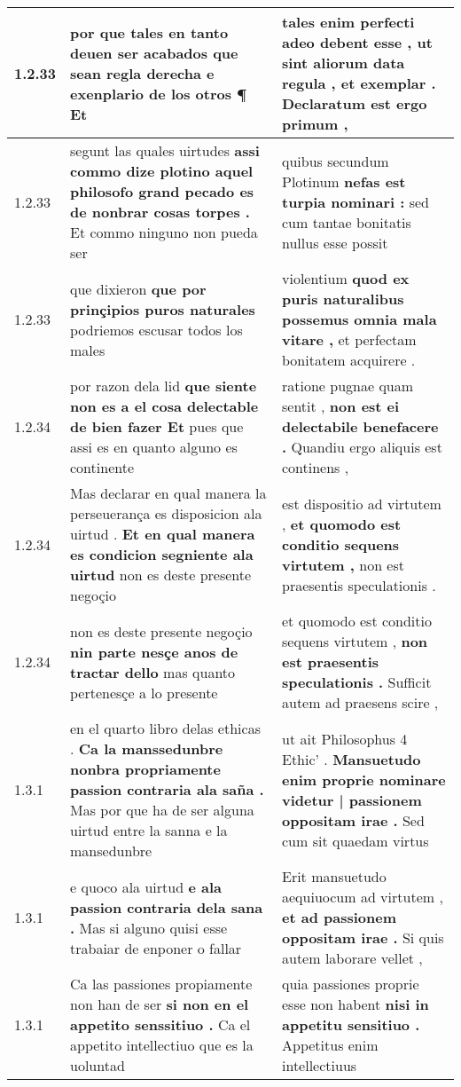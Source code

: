 \begin{tabular}{|p{1cm}|p{6.5cm}|p{6.5cm}|}
1.2.33 & por que tales en tanto deuen ser acabados \textbf{ que sean regla derecha e exenplario de los otros ¶ } Et & tales enim perfecti adeo debent esse , \textbf{ ut sint aliorum data regula , et exemplar . } Declaratum est ergo primum , \\\hline
1.2.33 & segunt las quales uirtudes \textbf{ assi commo dize plotino aquel philosofo grand pecado es de nonbrar cosas torpes . } Et commo ninguno non pueda ser & quibus secundum Plotinum \textbf{ nefas est turpia nominari : } sed cum tantae bonitatis nullus esse possit \\\hline
1.2.33 & que dixieron \textbf{ que por prinçipios puros naturales } podriemos escusar todos los males & violentium \textbf{ quod ex puris naturalibus possemus omnia mala vitare , } et perfectam bonitatem acquirere . \\\hline
1.2.34 & por razon dela lid \textbf{ que siente non es a el cosa delectable de bien fazer Et } pues que assi es en quanto alguno es continente & ratione pugnae quam sentit , \textbf{ non est ei delectabile benefacere . } Quandiu ergo aliquis est continens , \\\hline
1.2.34 & Mas declarar en qual manera la perseuerança es disposicion ala uirtud . \textbf{ Et en qual manera es condicion segniente ala uirtud } non es deste presente negoçio & est dispositio ad virtutem , \textbf{ et quomodo est conditio sequens virtutem , } non est praesentis speculationis . \\\hline
1.2.34 & non es deste presente negoçio \textbf{ nin parte nesçe anos de tractar dello } mas quanto pertenesçe a lo presente & et quomodo est conditio sequens virtutem , \textbf{ non est praesentis speculationis . } Sufficit autem ad praesens scire , \\\hline
1.3.1 & en el quarto libro delas ethicas . \textbf{ Ca la manssedunbre nonbra propriamente passion contraria ala saña . } Mas por que ha de ser alguna uirtud entre la sanna e la mansedunbre & ut ait Philosophus 4 Ethic’ . \textbf{ Mansuetudo enim proprie nominare videtur | passionem oppositam irae . } Sed cum sit quaedam virtus \\\hline
1.3.1 & e quoco ala uirtud \textbf{ e ala passion contraria dela sana . } Mas si alguno quisi esse trabaiar de enponer o fallar & Erit mansuetudo aequiuocum ad virtutem , \textbf{ et ad passionem oppositam irae . } Si quis autem laborare vellet , \\\hline
1.3.1 & Ca las passiones propiamente non han de ser \textbf{ si non en el appetito senssitiuo . } Ca el appetito intellectiuo que es la uoluntad & quia passiones proprie esse non habent \textbf{ nisi in appetitu sensitiuo . } Appetitus enim intellectiuus \\\hline

\end{tabular}
